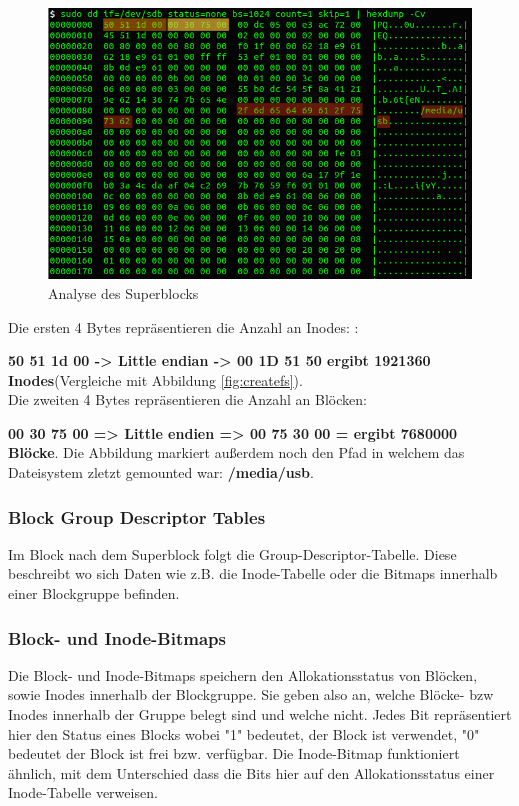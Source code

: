 \begin{figure}[H]
	\centering
	\includegraphics[width=12cm,keepaspectratio=true]{pictures/superblock.png}
	\caption{
		Analyse des Superblocks
	}
	\label{fig:superblock}
\end{figure}

Die ersten 4 Bytes repräsentieren die Anzahl an Inodes: \cite{Ext2.07.01.2022}:

\textbf{50 51 1d 00 -> Little endian -> 00 1D 51 50 ergibt 1921360 Inodes}(Vergleiche mit Abbildung \ref{fig:createfs}).\\Die zweiten 4 Bytes repräsentieren die Anzahl an Blöcken:

\textbf{00 30 75 00 => Little endien => 00 75 30 00 = ergibt 7680000 Blöcke}. Die Abbildung markiert außerdem noch den Pfad in welchem das Dateisystem zletzt gemounted war: \textbf{/media/usb}.


\subsubsection{Block Group Descriptor Tables}

Im Block nach dem Superblock folgt die Group-Descriptor-Tabelle. Diese beschreibt wo sich Daten wie z.B. die Inode-Tabelle oder die Bitmaps innerhalb einer Blockgruppe befinden. 


\subsubsection{Block- und Inode-Bitmaps}

Die Block- und Inode-Bitmaps speichern den Allokationsstatus von Blöcken, sowie Inodes innerhalb der Blockgruppe. Sie geben also an, welche Blöcke- bzw Inodes innerhalb der Gruppe belegt sind und welche nicht. Jedes Bit repräsentiert hier den Status eines Blocks wobei "1" bedeutet, der Block ist verwendet, "0" bedeutet der Block ist frei bzw. verfügbar. Die Inode-Bitmap funktioniert ähnlich, mit dem Unterschied dass die Bits hier auf den Allokationsstatus einer Inode-Tabelle verweisen.

